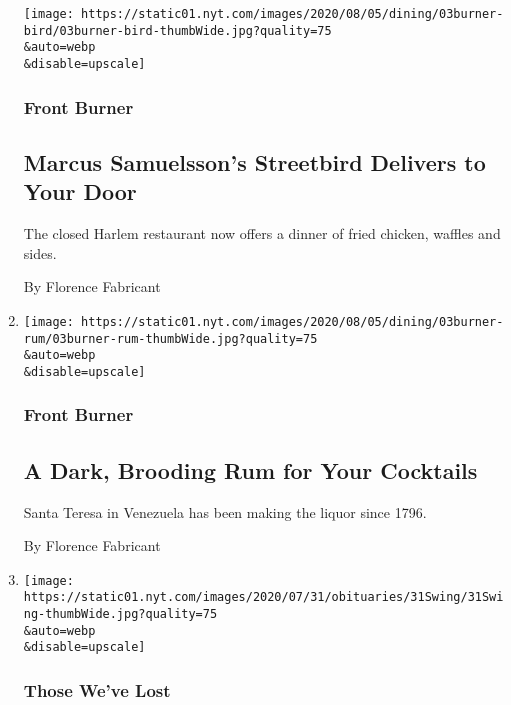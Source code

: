 \begin{enumerate}
  \texttt{[image: https://static01.nyt.com/images/2020/08/05/dining/03burner-bird/03burner-bird-thumbWide.jpg?quality=75\\\&auto=webp\\\&disable=upscale]}

  \hypertarget{front-burner-4}{%
  \subsubsection{Front Burner}\label{front-burner-4}}

  \hypertarget{marcus-samuelssons-streetbird-delivers-to-your-door}{%
  \subsection{Marcus Samuelsson's Streetbird Delivers to Your
  Door}\label{marcus-samuelssons-streetbird-delivers-to-your-door}}

  The closed Harlem restaurant now offers a dinner of fried chicken,
  waffles and sides.

  By Florence Fabricant
\item
  \href{/2020/08/03/dining/drinks/santa-teresa-rum.html}{}

  \texttt{[image: https://static01.nyt.com/images/2020/08/05/dining/03burner-rum/03burner-rum-thumbWide.jpg?quality=75\\\&auto=webp\\\&disable=upscale]}

  \hypertarget{front-burner-5}{%
  \subsubsection{Front Burner}\label{front-burner-5}}

  \hypertarget{a-dark-brooding-rum-for-your-cocktails}{%
  \subsection{A Dark, Brooding Rum for Your
  Cocktails}\label{a-dark-brooding-rum-for-your-cocktails}}

  Santa Teresa in Venezuela has been making the liquor since 1796.

  By Florence Fabricant
\item
  \href{/2020/08/03/obituaries/john-swing-dead-coronavirus.html}{}

  \texttt{[image: https://static01.nyt.com/images/2020/07/31/obituaries/31Swing/31Swing-thumbWide.jpg?quality=75\\\&auto=webp\\\&disable=upscale]}

  \hypertarget{those-weve-lost}{%
  \subsubsection{Those We've Lost}\label{those-weve-lost}}


\end{enumerate}
